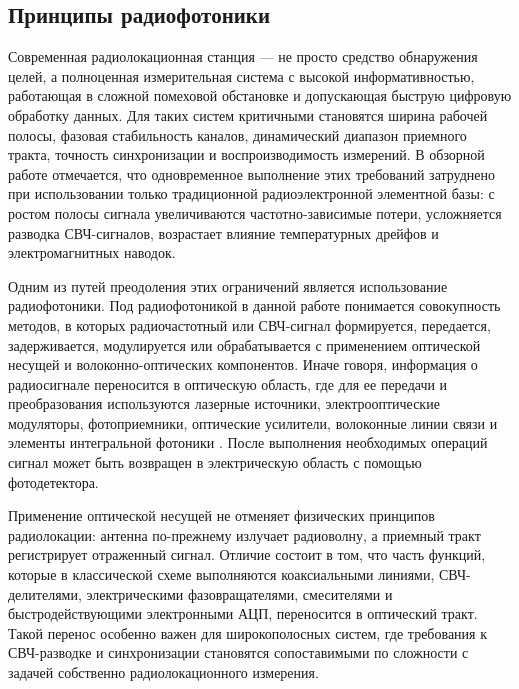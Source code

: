 \subsection{Принципы радиофотоники}

Современная радиолокационная станция --- не просто средство обнаружения
целей, а полноценная измерительная система с высокой информативностью,
работающая в сложной помеховой обстановке и допускающая быструю цифровую
обработку данных. Для таких систем критичными становятся ширина
рабочей полосы, фазовая стабильность каналов, динамический диапазон приемного
тракта, точность синхронизации и воспроизводимость измерений. В обзорной работе
\cite{shumov2016concept} отмечается, что одновременное выполнение этих требований
затруднено при использовании только традиционной радиоэлектронной элементной
базы: с ростом полосы сигнала увеличиваются частотно-зависимые потери, усложняется
разводка СВЧ-сигналов, возрастает влияние температурных дрейфов и электромагнитных
наводок.

Одним из путей преодоления этих ограничений является использование радиофотоники.
Под радиофотоникой в данной работе понимается совокупность методов, в которых
радиочастотный или СВЧ-сигнал формируется, передается, задерживается, модулируется
или обрабатывается с применением оптической несущей и волоконно-оптических
компонентов. Иначе говоря, информация о радиосигнале переносится в оптическую
область, где для ее передачи и преобразования используются лазерные источники,
электрооптические модуляторы, фотоприемники, оптические усилители, волоконные
линии связи и элементы интегральной фотоники \cite{zaitsev2012nanophotonics,
pan2014microwave}. После выполнения необходимых операций сигнал может быть
возвращен в электрическую область с помощью фотодетектора.

Применение оптической несущей не отменяет физических принципов радиолокации:
антенна по-прежнему излучает радиоволну, а приемный тракт регистрирует отраженный
сигнал. Отличие состоит в том, что часть функций,
которые в классической схеме выполняются коаксиальными линиями, СВЧ-делителями,
электрическими фазовращателями, смесителями и быстродействующими электронными
АЦП, переносится в оптический тракт. Такой перенос особенно важен для
широкополосных систем, где требования к СВЧ-разводке и синхронизации становятся
сопоставимыми по сложности с задачей собственно радиолокационного измерения.

